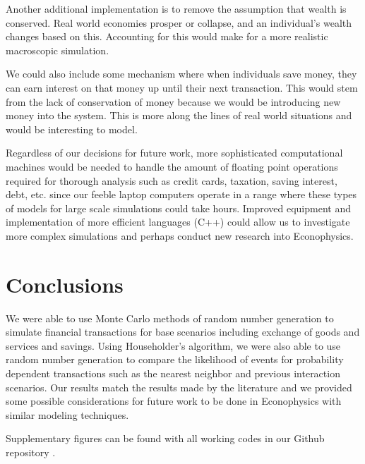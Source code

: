 \documentclass[11pt]{article}
\begin{document}
Another additional implementation is to remove the assumption that wealth is conserved. Real world economies prosper or collapse, and an individual's wealth changes based on this. Accounting for this would make for a more realistic macroscopic simulation. 

We could also include some mechanism where when individuals save money, they can earn interest on that money up until their next transaction. This would stem from the lack of conservation of money because we would be introducing new money into the system. This is more along the lines of real world situations and would be interesting to model.

Regardless of our decisions for future work, more sophisticated computational machines would be needed to handle the amount of floating point operations required for thorough analysis such as credit cards, taxation, saving interest, debt, etc. since our feeble laptop computers operate in a range where these types of models for large scale simulations could take hours. Improved equipment and implementation of more efficient languages (C++) could allow us to investigate more complex simulations and perhaps conduct new research into Econophysics.

\section{Conclusions}
We were able to use Monte Carlo methods of random number generation to simulate financial transactions for base scenarios including exchange of goods and services and savings. Using Householder's algorithm, we were also able to use random number generation to compare the likelihood of events for probability dependent transactions such as the nearest neighbor and previous interaction scenarios. Our results match the results made by the literature and we provided some possible considerations for future work to be done in Econophysics with similar modeling techniques.

Supplementary figures can be found with all working codes in our Github repository \cite{github}. 
\end{document}
